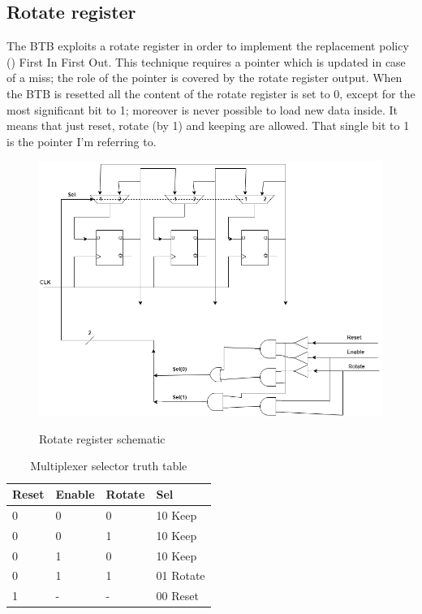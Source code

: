 \subsection{Rotate register}
The BTB exploits a rotate register in order to implement the replacement policy (\cite{EFESbook}) First In First Out. This technique requires a pointer which is updated in case of a miss; the role of the pointer is covered by the rotate register output. When the BTB is resetted all the content of the rotate register is set to 0, except for the most significant bit to 1; moreover is never possible to load new data inside. It means that just reset, rotate (by 1) and keeping are allowed. That single bit to 1 is the pointer I'm referring to.

\begin{figure}[H]
\centering
\includegraphics[scale=.6]{Immagini/14}
\label{14}
\caption{Rotate register schematic}
\end{figure}

\begin{table}[H]
\centering
\begin{tabular}{|p{}|p{}|p{}|p{}|}
\hline
\textbf{Reset}&\textbf{\textbf{Enable}}&\textbf{Rotate}&\textbf{Sel}\\ \hline
0 & 0 & 0 & 10 Keep\\ \hline
0 & 0 & 1 & 10 Keep\\ \hline
0 & 1 & 0 & 10 Keep\\ \hline
0 & 1 & 1 & 01 Rotate\\ \hline
1 & - & - & 00 Reset\\ \hline

\end{tabular}
\caption{Multiplexer selector  truth table}
\end{table}

